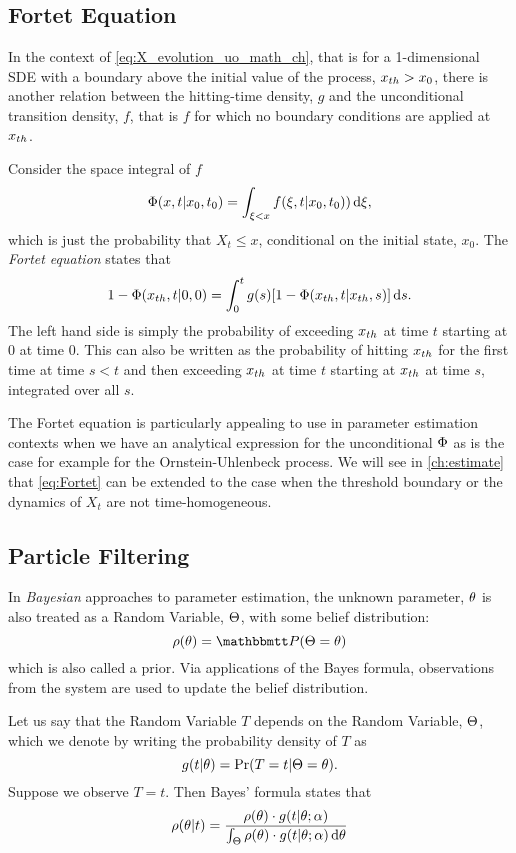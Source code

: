\subsection{Fortet Equation} 
In the context of \cref{eq:X_evolution_uo_math_ch}, that is for a 1-dimensional
SDE with a boundary above the initial value of the process, ${ x_{th} }>x_0$, there is
another relation between the hitting-time density, $g$ and the unconditional transition density,
$f$, that is $f$ for which no boundary conditions are applied at ${ x_{th} }$.

Consider the space integral of $f$
$$ {\Phi}(x,t|x_0, t_0) = \int_{\xi<x} f( \xi, t |x_0, t_0)) \, \mathrm{d} \xi,$$
which is just the probability that $X_t \leq x$, conditional on the initial
state, $x_0$. The {\sl Fortet equation} \cite{Fortet1943} states that
\begin{equation}
1 - {\Phi}({ x_{th} }, t|0, 0) =
\int_0^t g(s) [1-{\Phi} ({ x_{th} },  t| { x_{th} }, s)] \, \mathrm{d} s.
\label{eq:Fortet}
\end{equation}
The left hand side is simply the probability of exceeding ${ x_{th} }$ at time
$t$ starting at $0$ at time $0$. This can also be written as the probability
of hitting ${ x_{th} }$ for the first time at time $s < t$ and then exceeding
${ x_{th} }$ at time $t$ starting at ${ x_{th} }$ at time $s$, integrated over all $s$.

The Fortet equation is particularly appealing to use in parameter estimation
contexts when we have an analytical expression for the unconditional ${\Phi}$ as is
the case for example for the Ornstein-Uhlenbeck process. We will see in
\cref{ch:estimate} that \cref{eq:Fortet} can be extended to the case when the
threshold boundary or the dynamics of $X_t$ are not time-homogeneous.

\subsection{Particle Filtering}
In {\sl Bayesian} approaches to parameter estimation, the unknown parameter,
${ \theta}$ is also treated as a Random Variable, ${\Theta}$, with some belief
distribution: 
\begin{equation}
\rho(\th) = \Prob(\Theta = \th)
\label{eq:bayesian_prior} 
\end{equation} which is also called a
prior. Via applications of the Bayes formula, observations from the system are
used to update the belief distribution.

Let us say that the Random Variable $T$ depends on the Random Variable, ${\Theta}$,
which we denote by writing the probability density of $T$ as 
\begin{equation}g(t|{ \theta}) =
\Pr(T=t|{\Theta}={ \theta}).
\label{eq:bayesian_observation}
\end{equation}
Suppose we observe $T=t$. Then Bayes' formula
states that 
\begin{equation}
\rho({ \theta}|  t  ) = 
\frac{  \rho({ \theta}) \cdot g(t|{ \theta} ; \alpha) }
	 { \int_{\Theta}  \rho({ \theta}) \cdot  g(t|{ \theta} ; \alpha)  \, \mathrm{d} { \theta}}
\label{eq:bayesian_formula}
\end{equation}

